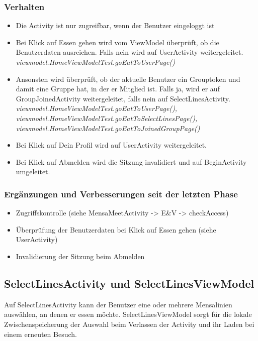 \documentclass[a4paper]{scrreprt}
\begin{document}
\subsubsection{Verhalten}
\begin{itemize}
\item Die Activity ist nur zugreifbar, wenn der Benutzer eingeloggt ist
\item Bei Klick auf Essen gehen wird vom ViewModel überprüft, ob die Benutzerdaten ausreichen. Falls nein wird auf UserActivity weitergeleitet. \\
\textit{viewmodel.HomeViewModelTest.goEatToUserPage()}
\item Ansonsten wird überprüft, ob der aktuelle Benutzer ein Grouptoken und damit eine Gruppe hat, in der er Mitglied ist. Falls ja, wird er auf GroupJoinedActivity weitergeleitet, falls nein auf SelectLinesActivity. \\
\textit{viewmodel.HomeViewModelTest.goEatToUserPage(), viewmodel.HomeViewModelTest.goEatToSelectLinesPage(), viewmodel.HomeViewModelTest.goEatToJoinedGroupPage()}
\item Bei Klick auf Dein Profil wird auf UserActivity weitergeleitet.
\item Bei Klick auf Abmelden wird die Sitzung invalidiert und auf BeginActivity umgeleitet.

\end{itemize}

\subsubsection{Ergänzungen und Verbesserungen seit der letzten Phase}
\begin{itemize}
\item Zugriffskontrolle (siehe MensaMeetActivity -> E\&V -> checkAccess)
\item Überprüfung der Benutzerdaten bei Klick auf Essen gehen (siehe UserActivity)
\item Invalidierung der Sitzung beim Abmelden
\end{itemize}

\subsection{SelectLinesActivity und SelectLinesViewModel}
Auf SelectLinesActivity kann der Benutzer eine oder mehrere Mensalinien auswählen, an denen er essen möchte. SelectLinesViewModel sorgt für die lokale Zwischenspeicherung der Auswahl beim Verlassen der Activity und ihr Laden bei einem erneuten Besuch.
\end{document}
